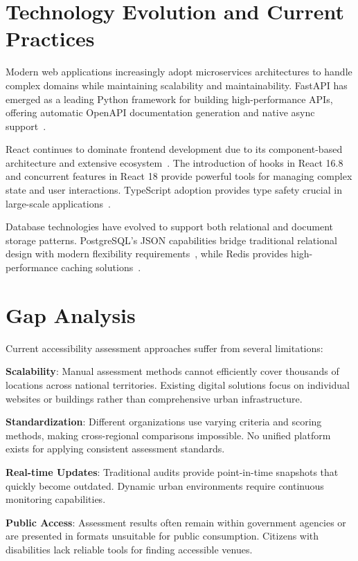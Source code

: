 \documentclass[a4paper,12pt,oneside]{book}
\begin{document}
\section{Technology Evolution and Current Practices}

Modern web applications increasingly adopt microservices architectures to handle complex domains while maintaining scalability and maintainability. FastAPI has emerged as a leading Python framework for building high-performance APIs, offering automatic OpenAPI documentation generation and native async support~\cite{ramirez_fastapi}.

React continues to dominate frontend development due to its component-based architecture and extensive ecosystem~\cite{react}. The introduction of hooks in React 16.8 and concurrent features in React 18 provide powerful tools for managing complex state and user interactions. TypeScript adoption provides type safety crucial in large-scale applications~\cite{typescript}.

Database technologies have evolved to support both relational and document storage patterns. PostgreSQL's JSON capabilities bridge traditional relational design with modern flexibility requirements~\cite{postgresql}, while Redis provides high-performance caching solutions~\cite{redis}.

\section{Gap Analysis}

Current accessibility assessment approaches suffer from several limitations:

\textbf{Scalability}: Manual assessment methods cannot efficiently cover thousands of locations across national territories. Existing digital solutions focus on individual websites or buildings rather than comprehensive urban infrastructure.

\textbf{Standardization}: Different organizations use varying criteria and scoring methods, making cross-regional comparisons impossible. No unified platform exists for applying consistent assessment standards.

\textbf{Real-time Updates}: Traditional audits provide point-in-time snapshots that quickly become outdated. Dynamic urban environments require continuous monitoring capabilities.

\textbf{Public Access}: Assessment results often remain within government agencies or are presented in formats unsuitable for public consumption. Citizens with disabilities lack reliable tools for finding accessible venues.
\end{document}

